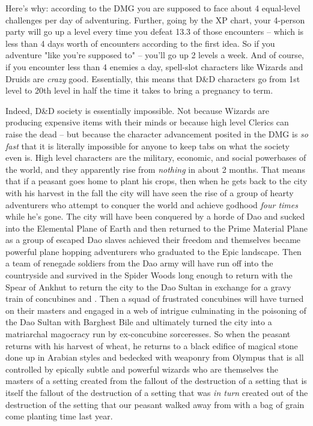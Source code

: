 Here's why: according to the DMG you are supposed to face about 4 equal-level challenges per day of adventuring. Further, going by the XP chart, your 4-person party will go up a level every time you defeat 13.3 of those encounters -- which is less than 4 days worth of encounters according to the first idea. So if you adventure "like you're supposed to" -- you'll go up 2 levels a week. And of course, if you encounter less than 4 enemies a day, spell-slot characters like Wizards and Druids are \textit{crazy} good. Essentially, this means that D\&D characters go from 1st level to 20th level in half the time it takes to bring a pregnancy to term.

Indeed, D\&D society is essentially impossible. Not because Wizards are producing expensive items with their minds or because high level Clerics can raise the dead -- but because the character advancement posited in the DMG is \textit{so fast} that it is literally impossible for anyone to keep tabs on what the society even is. High level characters are the military, economic, and social powerbases of the world, and they apparently rise from \textit{nothing} in about 2 \half months. That means that if a peasant goes home to plant his crops, then when he gets back to the city with his harvest in the fall the city will have seen the rise of a group of hearty adventurers who attempt to conquer the world and achieve godhood \textit{four times} while he's gone. The city will have been conquered by a horde of Dao and sucked into the Elemental Plane of Earth and then returned to the Prime Material Plane as a group of escaped Dao slaves achieved their freedom and themselves became powerful plane hopping adventurers who graduated to the Epic landscape. Then a team of renegade soldiers from the Dao army will have run off into the countryside and survived in the Spider Woods long enough to return with the Spear of Ankhut to return the city to the Dao Sultan in exchange for a gravy train of concubines and . Then a squad of frustrated concubines will have turned on their masters and engaged in a web of intrigue culminating in the poisoning of the Dao Sultan with Barghest Bile and ultimately turned the city into a matriarchal magocracy run by ex-concubine sorceresses. So when the peasant returns with his harvest of wheat, he returns to a black edifice of magical stone done up in Arabian styles and bedecked with weaponry from Olympus that is all controlled by epically subtle and powerful wizards who are themselves the masters of a setting created from the fallout of the destruction of a setting that is itself the fallout of the destruction of a setting that was \textit{in turn} created out of the destruction of the setting that our peasant walked away from with a bag of grain come planting time last year.


